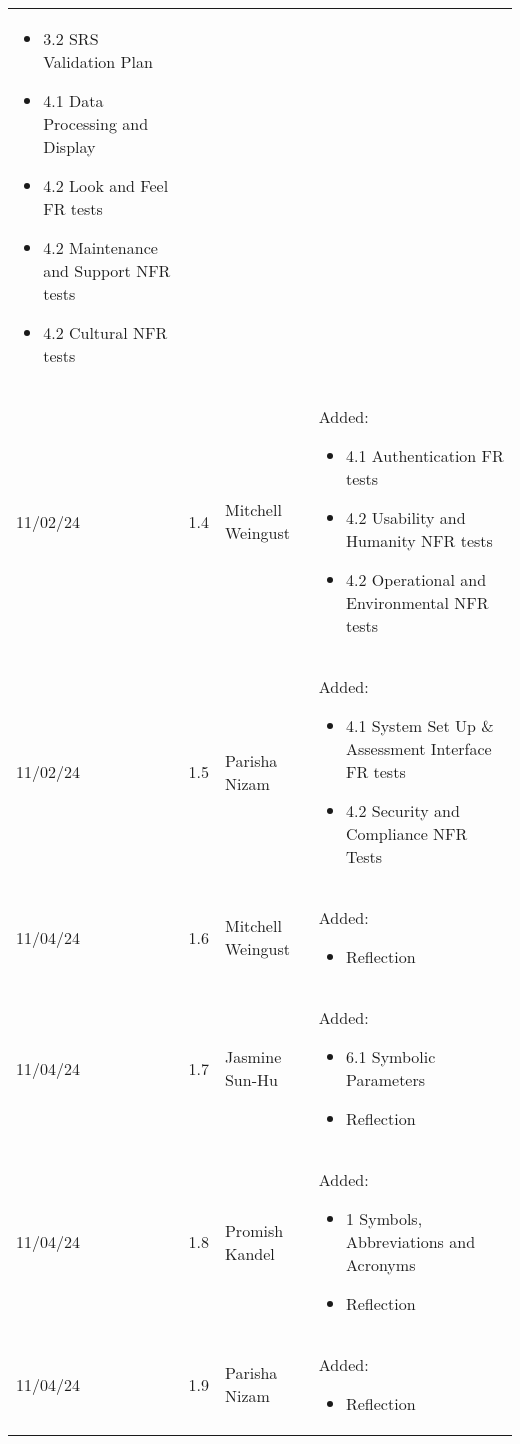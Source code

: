 \documentclass[12pt, titlepage]{article}
\begin{document}
\begin{table}[hp]
\begin{tabularx}{\textwidth}{p{1.5cm}p{1cm}p{3.5cm}X}
\begin{itemize}[leftmargin=*]
    \item 3.2 SRS Validation Plan
    \item 4.1 Data Processing and Display
    \item 4.2 Look and Feel FR tests
    \item 4.2 Maintenance and Support NFR tests
    \item 4.2 Cultural NFR tests
  \end{itemize}\\
  11/02/24 & 1.4 & Mitchell Weingust & Added:\begin{itemize}[leftmargin=*]
    \item 4.1 Authentication FR tests
    \item 4.2 Usability and Humanity NFR tests
    \item 4.2 Operational and Environmental NFR tests
  \end{itemize}\\
  11/02/24 & 1.5 & Parisha Nizam & Added:\begin{itemize}[leftmargin=*]
    \item 4.1 System Set Up \& Assessment Interface FR tests
    \item 4.2 Security and Compliance NFR Tests
  \end{itemize}\\
  11/04/24 & 1.6 & Mitchell Weingust & Added:\begin{itemize}[leftmargin=*]
    \item Reflection
  \end{itemize}\\
  11/04/24 & 1.7 & Jasmine Sun-Hu & Added:\begin{itemize}[leftmargin=*]
    \item 6.1 Symbolic Parameters
    \item Reflection
  \end{itemize}\\
  11/04/24 & 1.8 & Promish Kandel & Added:\begin{itemize}[leftmargin=*]
    \item 1 Symbols, Abbreviations and Acronyms
    \item Reflection
  \end{itemize}\\
  11/04/24 & 1.9 & Parisha Nizam & Added:\begin{itemize}[leftmargin=*]
    \item Reflection
  \end{itemize}\\
  \bottomrule
  \end{tabularx}
  \end{table}
\end{document}
